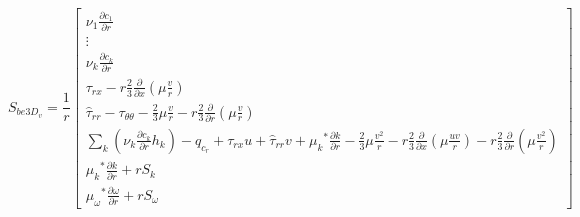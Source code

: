\begin{equation}
	S_{be3D_v} = \frac{1}{r}\left[ \begin{array}{c}
		\nu_1 \frac{\partial c_1}{\partial r} \\
		\vdots \\
		\nu_k \frac{\partial c_k}{\partial r} \\
		\tau_{rx} - r\frac{2}{3}\frac{\partial}{\partial x}(\mu \frac{v}{r}) \\
		\hat{\tau}_{rr} -\tau_{\theta \theta} - \frac{2}{3}\mu \frac{v}{r} 
		- r\frac{2}{3}\frac{\partial}{\partial r}(\mu \frac{v}{r}) \\
		\sum_k (\nu_k \frac{\partial c_k}{\partial r}h_k) - q_{c_r} + \tau_{rx}u 
		+ \hat \tau_{rr}v + {\mu_k}^* \frac{\partial k}{\partial r} - \frac{2}{3} \mu \frac{v^2}{r}
			- r\frac{2}{3} \frac{\partial}{\partial x}(\mu \frac{uv}{r})
			- r\frac{2}{3} \frac{\partial}{\partial r}(\mu \frac{v^2}{r}) \\
		{\mu_k}^* \frac{\partial k}{\partial r} + rS_k\\
		{\mu_\omega}^* \frac{\partial \omega}{\partial r} + rS_\omega
		   \end{array}
	    \right]
\label{eqn:finalHv}
\end{equation}

